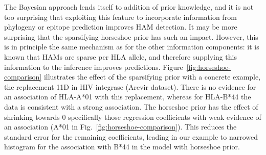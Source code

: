\documentclass{bioinfo}
\begin{document}
The Bayesian approach lends itself to addition of prior knowledge, and it is not too surprising that exploiting this feature to incorporate information from phylogeny or epitope prediction improves HAM detection. It may be more surprising that the sparsifying horseshoe prior has such an impact. However, this is in principle the same mechanism as for the other information components: it is known that HAMs are sparse per HLA allele, and therefore supplying this information to the inference improves predictions. Figure~\ref{fig:horseshoe-comparison} illustrates the effect of the sparsifying prior with a concrete example, the replacement 11D in HIV integrase (Arevir dataset). There is no evidence for an association of HLA-A*01 with this replacement, whereas for HLA-B*44 the data is consistent with a strong association.  The horseshoe prior has the effect of shrinking towards 0 specifically those regression coefficients with weak evidence of an association (A*01 in Fig.~\ref{fig:horseshoe-comparison}). This reduces the standard error for the remaining coefficients, leading in our example to narrowed histogram for the association with B*44 in the model with horseshoe prior.
\end{document}

